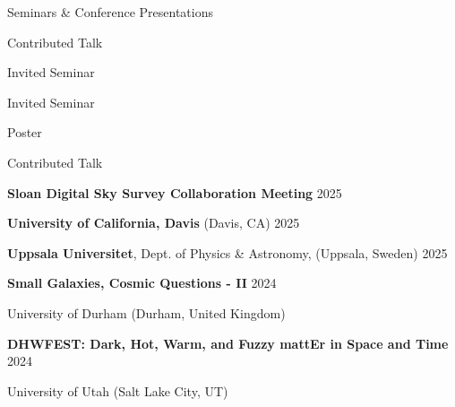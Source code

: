 \documentclass[cv.tex]{subfiles}
\begin{document}
\vspace{5mm}
\noindent
{\color{themecolor} \large Seminars \& Conference Presentations}
\vspace{1mm}
\par\noindent
\parbox{0.18\textwidth}{%
	\raggedleft
	Contributed Talk \par
	Invited Seminar \par
	Invited Seminar \par
	Poster \par
	\null \par
	Contributed Talk \par
	\null \par
}
\hspace{1mm}
\parbox{0.8\textwidth}{%
	\vspace{1mm}
	\textbf{Sloan Digital Sky Survey Collaboration Meeting} \hfill 2025 \par
	\textbf{University of California, Davis} (Davis, CA) \hfill 2025 \par
	\textbf{Uppsala Universitet}, Dept. of Physics \& Astronomy,
	(Uppsala, Sweden) \hfill 2025 \par
	\textbf{Small Galaxies, Cosmic Questions - II} \hfill 2024 \par
	University of Durham (Durham, United Kingdom) \par
	\textbf{DHWFEST: Dark, Hot, Warm, and Fuzzy mattEr in Space and Time}
	\hfill 2024 \par
	University of Utah (Salt Lake City, UT) \par
}
\end{document}
